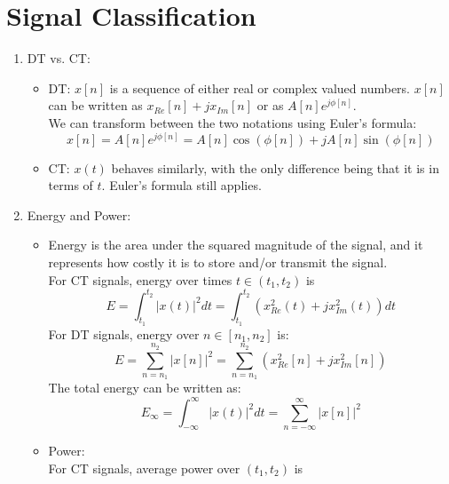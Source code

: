 \documentclass[nobib]{tufte-handout}
\begin{document}
\section{Signal Classification}
\begin{enumerate}
    \item DT vs. CT:\begin{itemize}
              \item DT: $x[n]$ is a sequence of either real or complex valued numbers. $x[n]$ can
                    be written as $x_{Re}[n]+jx_{Im}[n]$ or as $A[n]e^{j\phi[n]}$.\\ We can
                    transform between the two notations using Euler's formula:
                    \begin{equation*}
                        x[n] = A[n]e^{j\phi[n]} = A[n]\cos(\phi[n])+jA[n]\sin(\phi[n])
                    \end{equation*}
              \item CT: $x(t)$ behaves similarly, with the only difference being that it is in
                    terms of $t$. Euler's formula still applies.
          \end{itemize}
    \item Energy and Power: \begin{itemize}
              \item Energy is the area under the squared magnitude of the signal, and it represents
                    how costly it is to store and/or transmit the signal. \\For CT signals, energy
                    over times $t \in (t_1,t_2)$ is \begin{equation*}
                        E = \int_{t_1}^{t_2} |x(t)|^2 dt = \int_{t_1}^{t_2}(x_{Re}^2(t)+jx_{Im}^2(t)) dt
                    \end{equation*}
                    For DT signals, energy over $n \in [n_1,n_2]$ is:
                    \begin{equation*}
                        E = \sum_{n=n_1}^{n_2}|x[n]|^2 = \sum_{n=n_1}^{n_2}(x_{Re}^2[n]+jx_{Im}^2[n])
                    \end{equation*}
                    The total energy can be written as: \begin{equation*}
                        E_\infty = \int_{-\infty}^{\infty} |x(t)|^2 dt = \sum_{n = -\infty}^{\infty} |x[n]|^2
                    \end{equation*}
              \item Power: \\ For CT signals, average power over $(t_1,t_2)$ is \begin{equation*}

\end{equation*}
\end{itemize}
\end{enumerate}
\end{document}
